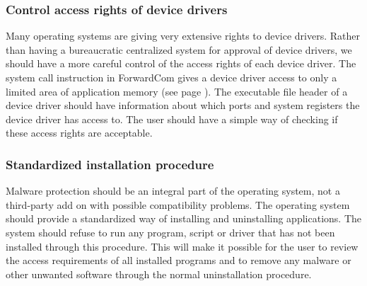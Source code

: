 \documentclass[forwardcom.tex]{subfiles}
\begin{document}
\subsubsection{Control access rights of device drivers} 
Many operating systems are giving very extensive rights to device drivers. Rather than having a bureaucratic centralized system for approval of device drivers, we should have a more careful control of the access rights of each device driver. The system call instruction in ForwardCom gives a device driver access to only a limited area of application memory (see page \pageref{systemCallInstruction}). The executable file header of a device driver should have information about which ports and system registers the device driver has access to. The user should have a simple way of checking if these access rights are acceptable.

\subsubsection{Standardized installation procedure} 
Malware protection should be an integral part of the operating system, not a third-party add on with possible compatibility problems. The operating system should provide a standardized way of installing and uninstalling applications. The system should refuse to run any program, script or driver that has not been installed through this procedure. This will make it possible for the user to review the access requirements of all installed programs and to remove any malware or other unwanted software through the normal uninstallation procedure.
\end{document}
